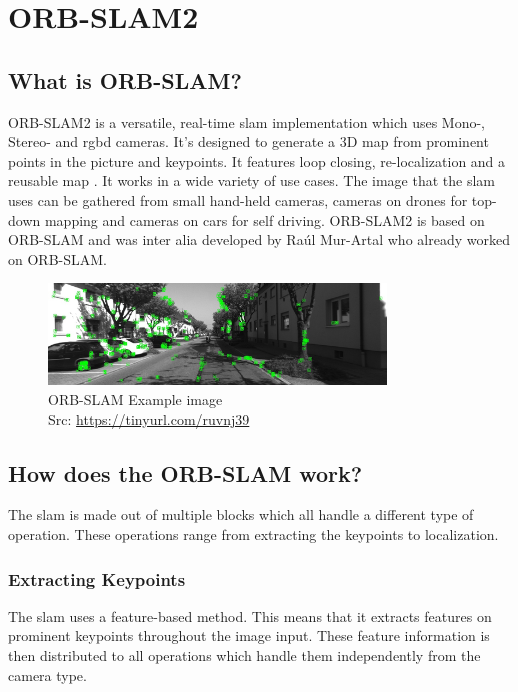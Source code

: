 
\chapter{ORB-SLAM2\authorA}\label{ref:orbslam}

\section{What is ORB-SLAM?}
ORB-SLAM2 is a versatile, real-time \gls{slam} implementation which uses Mono-, Stereo- and \gls{rgbd} cameras. It's designed to generate a 3D map from prominent points in the picture and keypoints. It features loop closing, re-localization and a reusable map \cite{orbslam2}. It works in a wide variety of use cases. The image that the \gls{slam} uses can be gathered from small hand-held cameras, cameras on drones for top-down mapping and cameras on cars for self driving.
ORB-SLAM2 is based on ORB-SLAM and was inter alia developed by Raúl Mur-Artal who already worked on ORB-SLAM.\newline
\begin{figure}[h]
	\centering
	\includegraphics[width=0.8\textwidth]{./media/images/orb-slam-kitti-dataset.png}
  	\caption{ORB-SLAM Example image
  	\\Src: \url{https://tinyurl.com/ruvnj39}}
  	\label{orbslamkittidataset}
\end{figure}

\section{How does the ORB-SLAM work?}

The \gls{slam} is made out of multiple blocks which all handle a different type of operation. These operations range from extracting the keypoints to localization.

\subsection{Extracting Keypoints}
The \gls{slam} uses a feature-based method. This means that it extracts features on prominent keypoints throughout the image input. These feature information is then distributed to all operations which handle them independently from the camera type. \cite{orbslam2} \newline\newline


